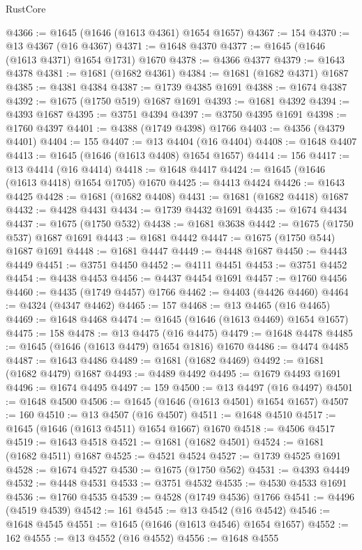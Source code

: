 \begin{lexlean}{RustCore}
\begin{coremodule}
@4366 := @1645 (@1646 (@1613 @4361) @1654 @1657)
@4367 := 154
@4370 := @13 @4367 (@16 @4367)
@4371 := @1648 @4370
@4377 := @1645 (@1646 (@1613 @4371) @1654 @1731) @1670
@4378 := @4366 @4377
@4379 := @1643 @4378
@4381 := @1681 (@1682 @4361)
@4384 := @1681 (@1682 @4371) @1687
@4385 := @4381 @4384
@4387 := @1739 @4385 @1691
@4388 := @1674 @4387
@4392 := @1675 (@1750 @519) @1687 @1691
@4393 := @1681 @4392
@4394 := @4393 @1687
@4395 := @3751 @4394
@4397 := @3750 @4395 @1691
@4398 := @1760 @4397
@4401 := @4388 (@1749 @4398) @1766
@4403 := @4356 (@4379 @4401)
@4404 := 155
@4407 := @13 @4404 (@16 @4404)
@4408 := @1648 @4407
@4413 := @1645 (@1646 (@1613 @4408) @1654 @1657)
@4414 := 156
@4417 := @13 @4414 (@16 @4414)
@4418 := @1648 @4417
@4424 := @1645 (@1646 (@1613 @4418) @1654 @1705) @1670
@4425 := @4413 @4424
@4426 := @1643 @4425
@4428 := @1681 (@1682 @4408)
@4431 := @1681 (@1682 @4418) @1687
@4432 := @4428 @4431
@4434 := @1739 @4432 @1691
@4435 := @1674 @4434
@4437 := @1675 (@1750 @532)
@4438 := @1681 @3638
@4442 := @1675 (@1750 @537) @1687 @1691
@4443 := @1681 @4442
@4447 := @1675 (@1750 @544) @1687 @1691
@4448 := @1681 @4447
@4449 := @4448 @1687
@4450 := @4443 @4449
@4451 := @3751 @4450
@4452 := @4111 @4451
@4453 := @3751 @4452
@4454 := @4438 @4453
@4456 := @4437 @4454 @1691
@4457 := @1760 @4456
@4460 := @4435 (@1749 @4457) @1766
@4462 := @4403 (@4426 @4460)
@4464 := @4324 (@4347 @4462)
@4465 := 157
@4468 := @13 @4465 (@16 @4465)
@4469 := @1648 @4468
@4474 := @1645 (@1646 (@1613 @4469) @1654 @1657)
@4475 := 158
@4478 := @13 @4475 (@16 @4475)
@4479 := @1648 @4478
@4485 := @1645 (@1646 (@1613 @4479) @1654 @1816) @1670
@4486 := @4474 @4485
@4487 := @1643 @4486
@4489 := @1681 (@1682 @4469)
@4492 := @1681 (@1682 @4479) @1687
@4493 := @4489 @4492
@4495 := @1679 @4493 @1691
@4496 := @1674 @4495
@4497 := 159
@4500 := @13 @4497 (@16 @4497)
@4501 := @1648 @4500
@4506 := @1645 (@1646 (@1613 @4501) @1654 @1657)
@4507 := 160
@4510 := @13 @4507 (@16 @4507)
@4511 := @1648 @4510
@4517 := @1645 (@1646 (@1613 @4511) @1654 @1667) @1670
@4518 := @4506 @4517
@4519 := @1643 @4518
@4521 := @1681 (@1682 @4501)
@4524 := @1681 (@1682 @4511) @1687
@4525 := @4521 @4524
@4527 := @1739 @4525 @1691
@4528 := @1674 @4527
@4530 := @1675 (@1750 @562)
@4531 := @4393 @4449
@4532 := @4448 @4531
@4533 := @3751 @4532
@4535 := @4530 @4533 @1691
@4536 := @1760 @4535
@4539 := @4528 (@1749 @4536) @1766
@4541 := @4496 (@4519 @4539)
@4542 := 161
@4545 := @13 @4542 (@16 @4542)
@4546 := @1648 @4545
@4551 := @1645 (@1646 (@1613 @4546) @1654 @1657)
@4552 := 162
@4555 := @13 @4552 (@16 @4552)
@4556 := @1648 @4555

\end{coremodule}
\end{lexlean}
